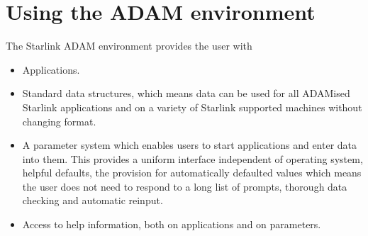 \section{Using the ADAM environment}
\label{m:useadam}
The Starlink ADAM environment provides the user with
\begin{itemize}
\item Applications.
\item Standard data structures, which means data can be used for all
ADAMised Starlink applications and on a variety of Starlink supported machines
without changing format.
\item A parameter system which enables users to start applications and enter
data into them. This provides a uniform interface independent of operating
system, helpful defaults, the provision for automatically defaulted values which
means the user does not need to respond to a long list of prompts, thorough data
checking and automatic reinput.
\item Access to help information, both on applications and on parameters.
\end{itemize}

